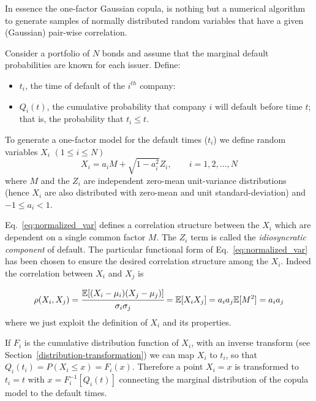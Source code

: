 In essence the one-factor Gaussian copula, is nothing but a numerical algorithm to generate samples of normally distributed random variables that have a given (Gaussian) pair-wise correlation. 

Consider a portfolio of \(N\) bonds and assume that the marginal default probabilities are known for each issuer. Define:

\begin{itemize}
\tightlist
\item
\(t_i\), the time of default of the \(i^{th}\) company:
\item \(Q_i(t)\), the cumulative probability that company \(i\) will default before time \(t\); that is, the probability that \(t_i \le t\).
\end{itemize}

To generate a one-factor model for the default times (\(t_i\)) we define random variables \(X_i\) \((1\le i \le N)\)
\begin{equation}
X_i = a_i M + \sqrt{1-a_i^2}Z_i,\qquad i = 1, 2,\ldots, N
\label{eq:normalized_var}
\end{equation}
where \(M\) and the \(Z_i\) are independent zero-mean unit-variance  distributions (hence $X_i$ are also distributed with zero-mean and unit standard-deviation) and \(-1 \le a_i \lt 1\).

Eq.~\ref{eq:normalized_var} defines a correlation structure between the \(X_i\) which are dependent on a single common factor \(M\). The $Z_i$ term is called the \emph{idiosyncratic component} of default. The particular functional form of Eq.~\ref{eq:normalized_var} has been chosen to ensure the desired correlation structure among the $X_i$. Indeed the correlation between \(X_i\) and \(X_j\) is

\begin{equation*}
\rho(X_i, X_j) = \cfrac{\mathbb{E}[(X_i-\mu_i)(X_j-\mu_j)]}{\sigma_{i}\sigma_{j}} =\mathbb{E}[X_i X_j] = a_i a_j \mathbb{E}[M^2] = a_i a_j
\end{equation*}
where we just exploit the definition of $X_i$ and its properties.

If $F_i$ is the cumulative distribution function of $X_i$, with an inverse transform (see Section~\ref{distribution-transformation}) we can map \(X_i\) to \(t_i\), so that $Q_i(t_i) = P(X_i\le x)=F_i(x)$. Therefore a point \(X_i = x\) is transformed to \(t_i = t\) with \(x = F_i^{-1}[Q_i(t)]\) connecting the marginal distribution of the copula model to the default times.


